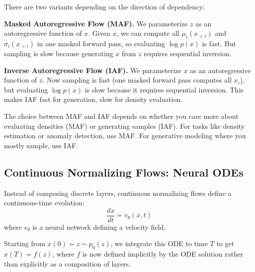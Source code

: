 \vspace{0.3cm}

There are two variants depending on the direction of dependency:

\vspace{0.3cm}

\textbf{Masked Autoregressive Flow (MAF).} We parameterize $z$ as an autoregressive function of $x$. Given $x$, we can compute all $\mu_i(x_{<i})$ and $\sigma_i(x_{<i})$ in one masked forward pass, so evaluating $\log p(x)$ is fast. But sampling is slow because generating $x$ from $z$ requires sequential inversion.

\vspace{0.3cm}

\textbf{Inverse Autoregressive Flow (IAF).} We parameterize $x$ as an autoregressive function of $z$. Now sampling is fast (one masked forward pass computes all $x_i$), but evaluating $\log p(x)$ is slow because it requires sequential inversion. This makes IAF fast for generation, slow for density evaluation.

\vspace{0.3cm}

The choice between MAF and IAF depends on whether you care more about evaluating densities (MAF) or generating samples (IAF). For tasks like density estimation or anomaly detection, use MAF. For generative modeling where you mostly sample, use IAF.

\vspace{1.5em}

\subsection{Continuous Normalizing Flows: Neural ODEs}

Instead of composing discrete layers, continuous normalizing flows define a continuous-time evolution:
%
\begin{equation}
\frac{dx}{dt} = v_\theta(x, t)
\end{equation}
%
where $v_\theta$ is a neural network defining a velocity field.

\vspace{0.3cm}

Starting from $x(0) = z \sim p_0(z)$, we integrate this ODE to time $T$ to get $x(T) = f(z)$, where $f$ is now defined implicitly by the ODE solution rather than explicitly as a composition of layers.

\vspace{0.3cm}

